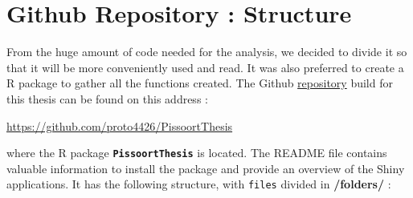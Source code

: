 \chapter{Github Repository : Structure}\label{appgit}

From the huge amount of code needed for the analysis, we decided to divide it so that it will be more conveniently used and read. It was also preferred to create a R package to gather all the functions created.
The Github \href{https://github.com/proto4426/PissoortThesis/}{repository} build for this thesis can be found on this address :

\begin{center}
\url{https://github.com/proto4426/PissoortThesis}
\end{center}
where the R package \textbf{\texttt{PissoortThesis}} is located. The README file contains valuable information to install the package and provide an overview of the Shiny applications. It has the following structure, with \texttt{files} divided in \textbf{/folders/} : 

